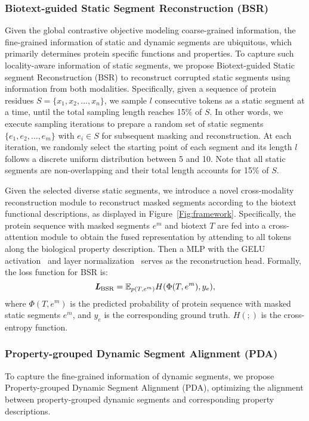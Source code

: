 \subsubsection{Biotext-guided Static Segment Reconstruction (BSR)}
Given the global contrastive objective modeling coarse-grained information, the fine-grained information of static and dynamic segments are ubiquitous, which primarily determines protein specific functions and properties. To capture such locality-aware information of static segments, we propose Biotext-guided Static segment Reconstruction (BSR) to reconstruct corrupted static segments using information from both modalities.
Specifically, given a sequence of protein residues $S=\{x_1, x_2,\dots,x_n\}$, we sample $l$ consecutive tokens as a static segment at a time, until the total sampling length reaches 15\% of $S$. In other words, we execute sampling iterations to prepare a random set of static segments $\{e_1, e_2, \dots, e_m\}$ with $e_i \in S$ for subsequent masking and reconstruction. 
At each iteration, we randomly select the starting point of each segment and its length $l$ follows a discrete uniform distribution between 5 and 10.
Note that all static segments are non-overlapping and their total length accounts for 15\% of $S$. 

Given the selected diverse static segments, we introduce a novel cross-modality reconstruction module to reconstruct masked segments according to the biotext functional descriptions, as displayed in Figure~\ref{Fig:framework}. Specifically, the protein sequence with masked segments $e^{m}$ and biotext $T$ are fed into a cross-attention module to obtain the fused representation by attending to all tokens along the biological property description. Then a MLP with the GELU activation~\cite{GELU} and layer normalization~\cite{LN} serves as the reconstruction head.
Formally, the loss function for BSR is:
\begin{equation}
    \textit{\textbf{L}}_{\text{BSR}} = \mathbb{E}_{p(T, e^{m})} H(\Phi(T, e^{m}), y_e),
\end{equation}
where $\Phi(T, e^{m})$ is the predicted probability of protein sequence with masked static segments $e^{m}$, and $y_e$ is the corresponding ground truth. $H(;)$ is the cross-entropy function. 

\subsubsection{Property-grouped Dynamic Segment Alignment (PDA)}
To capture the fine-grained information of dynamic segments, we propose Property-grouped Dynamic Segment Alignment (PDA), optimizing the alignment between property-grouped dynamic segments and corresponding property descriptions.

